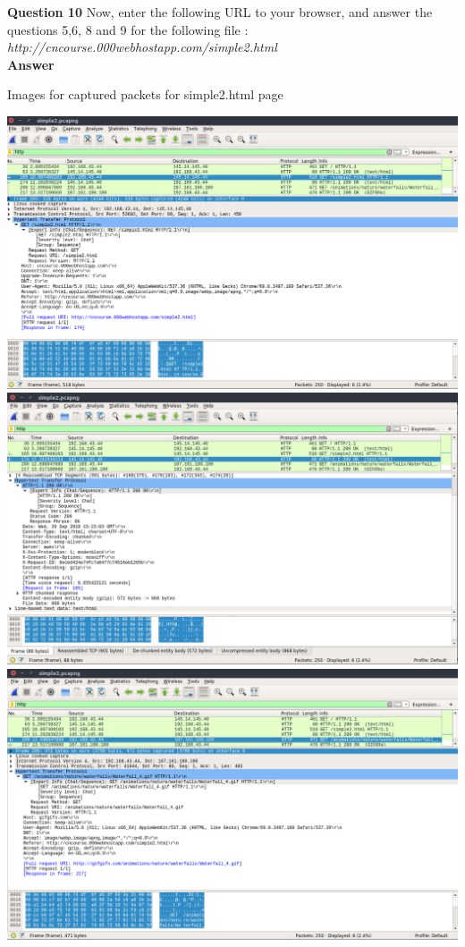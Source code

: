 \documentclass[14pt]{extarticle}
\begin{document}
    \noindent
    \textbf{\large Question 10}
    Now, enter the following URL to your browser, and 
    answer the questions 5,6, 8 and 9 for the following file :
    \textsl{http://cncourse.000webhostapp.com/simple2.html}\\
    \textbf{\large Answer}
    \begin{center}
        {\large \textmd{Images for captured packets for simple2.html page}}\\
    \end{center}
    \includegraphics[scale=0.40]{1_10_1}\\[10pt]
    \includegraphics[scale=0.40]{1_10_2}\\[10pt]
    \includegraphics[scale=0.40]{1_10_3}\\[10pt]
\end{document}
